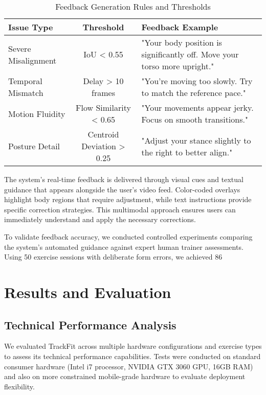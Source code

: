\documentclass[conference]{IEEEtran}
\begin{document}
\begin{table}[h]
\caption{Feedback Generation Rules and Thresholds}
\centering
\begin{tabular}{|l|c|p{4.5cm}|}
\hline
\textbf{Issue Type} & \textbf{Threshold} & \textbf{Feedback Example} \\
\hline
Severe Misalignment & IoU < 0.55 & "Your body position is significantly off. Move your torso more upright." \\
\hline
Temporal Mismatch & Delay > 10 frames & "You're moving too slowly. Try to match the reference pace." \\
\hline
Motion Fluidity & Flow Similarity < 0.65 & "Your movements appear jerky. Focus on smooth transitions." \\
\hline
Posture Detail & Centroid Deviation > 0.25 & "Adjust your stance slightly to the right to better align." \\
\hline
\end{tabular}
\end{table}

The system's real-time feedback is delivered through visual cues and textual guidance that appears alongside the user's video feed. Color-coded overlays highlight body regions that require adjustment, while text instructions provide specific correction strategies. This multimodal approach ensures users can immediately understand and apply the necessary corrections.

To validate feedback accuracy, we conducted controlled experiments comparing the system's automated guidance against expert human trainer assessments. Using 50 exercise sessions with deliberate form errors, we achieved 86%

\section{Results and Evaluation}

\subsection{Technical Performance Analysis}
We evaluated TrackFit across multiple hardware configurations and exercise types to assess its technical performance capabilities. Tests were conducted on standard consumer hardware (Intel i7 processor, NVIDIA GTX 3060 GPU, 16GB RAM) and also on more constrained mobile-grade hardware to evaluate deployment flexibility.
\end{document}
